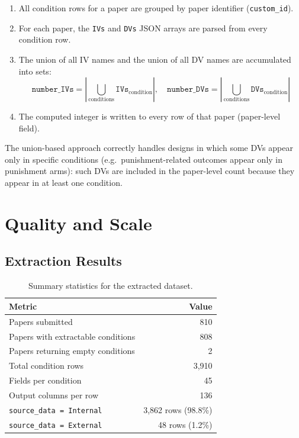 \documentclass[11pt,a4paper]{article}
\begin{document}
\begin{enumerate}[noitemsep]
  \item All condition rows for a paper are grouped by paper identifier (\texttt{custom\_id}).
  \item For each paper, the \texttt{IVs} and \texttt{DVs} JSON arrays are parsed from every condition row.
  \item The union of all IV names and the union of all DV names are accumulated into sets:
    \[
      \texttt{number\_IVs} = \left|\bigcup_{\text{conditions}} \texttt{IVs}_{\text{condition}}\right|, \quad
      \texttt{number\_DVs} = \left|\bigcup_{\text{conditions}} \texttt{DVs}_{\text{condition}}\right|
    \]
  \item The computed integer is written to every row of that paper (paper-level field).
\end{enumerate}

The union-based approach correctly handles designs in which some DVs appear only in specific conditions (e.g.\ punishment-related outcomes appear only in punishment arms): such DVs are included in the paper-level count because they appear in at least one condition.

\section{Quality and Scale}
\label{sec:quality}

\subsection{Extraction Results}

\begin{table}[h!]
\centering
\begin{tabular}{lr}
\toprule
\textbf{Metric} & \textbf{Value} \\
\midrule
Papers submitted & 810 \\
Papers with extractable conditions & 808 \\
Papers returning empty conditions & 2 \\
Total condition rows & 3{,}910 \\
Fields per condition & 45 \\
Output columns per row & 136 \\
\midrule
\texttt{source\_data = Internal} & 3{,}862 rows (98.8\%) \\
\texttt{source\_data = External} & 48 rows (1.2\%) \\
\bottomrule
\end{tabular}
\caption{Summary statistics for the extracted dataset.}
\label{tab:stats}
\end{table}
\end{document}
